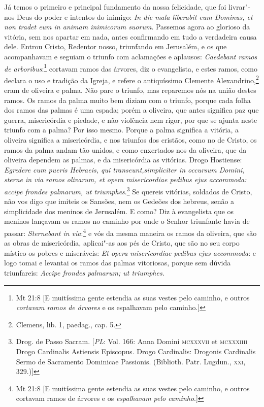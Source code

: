 Já temos o primeiro e principal fundamento da nossa felicidade, que foi
livrar"-nos Deus do poder e intentos do inimigo: \emph{In die mala
liberabit eum Dominus, et non tradet eum in animam inimicorum
suorum}. Passemos agora ao glorioso da vitória, sem nos
apartar em nada, antes confirmando em tudo a verdadeira causa dele.
Entrou Cristo, Redentor nosso, triunfando em Jerusalém, e os que
acompanhavam e seguiam o triunfo com aclamações e aplausos:
\emph{Caedebant ramos de arboribus}:\footnote{Mt 21:8 [E muitíssima gente estendia as suas vestes pelo caminho, e outros \textit{cortavam ramos de árvores} e os espalhavam pelo caminho.]} cortavam ramos das
árvores, diz o evangelista, e estes ramos, como declara o uso e
tradição da Igreja, e refere o antiquíssimo Clemente
Alexandrino,\footnote{Clemens, lib. 1, paedag., cap. 5.} eram de oliveira e palma. Não pare o
triunfo, mas reparemos nós na união destes ramos. Os ramos da palma
muito bem diziam com o triunfo, porque cada folha dos ramos das palmas é
uma espada; porém a oliveira, que antes significa paz que guerra,
misericórdia e piedade, e não violência nem rigor, por que se ajunta
neste triunfo com a palma?
Por isso mesmo. Porque a palma significa a vitória, a oliveira significa
a misericórdia, e nos triunfos dos cristãos, como no de Cristo, os ramos
da palma andam tão unidos, e como enxertados nos da oliveira, que da
oliveira dependem as palmas, e da misericórdia as vitórias. Drogo
Hostiense: \emph{Egredere cum pueris Hebraeis, qui transeunt,simpliciter
in occursum Domini, sterne in via ramos olivarum, et opera misericordiae
pedibus ejus accommoda: accipe frondes palmarum, ut triumphes}.\footnote{Drog. de Passo Sacram. [\textit{PL}: Vol. 166: Anna Domini \textsc{mcxxxvii} et \textsc{mcxxxiiii} Drogo Cardinalis Astiensis Episcopus. Drogo Cardinalis: Drogonis Cardinalis Sermo de Sacramento Dominicae Passionis. (Biblioth. Patr. Lugdun., \textsc{xxi}, 329.)]}
Se quereis vitórias, soldados de Cristo, não vos digo que imiteis os
Sansões, nem os Gedeões dos hebreus, senão a simplicidade dos meninos de
Jerusalém. E como? Diz à evangelista que os meninos lançavam os ramos no
caminho por onde o Senhor triunfante havia de passar: \emph{Sternebant
in via}:\footnote{Mt 21:8 [E muitíssima gente estendia as suas vestes pelo caminho, e outros cortavam ramos de árvores e os \textit{espalhavam pelo caminho}.]} e vós da mesma maneira os ramos da oliveira, que
são as obras de misericórdia, aplicai"-as aos pés de Cristo, que são no
seu corpo místico os pobres e miseráveis: \emph{Et opera misericordiae
pedibus ejus accommoda}: e logo tomai e levantai os ramos das palmas
vitoriosas, porque sem dúvida triunfareis: \emph{Accipe frondes
palmarum; ut triumphes.}

